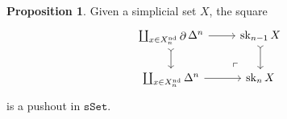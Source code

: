 \documentclass[11pt, reqno]{amsart}
\theoremstyle{definition}
\newtheorem{proposition}[theorem]{Proposition}
\newtheorem{corollary}[theorem]{Corollary}
\newcommand{\N}{\mathbf{N}}
\newcommand{\catfont}{\texttt}
\newcommand{\Set}{{\catfont{Set}}}          %
\newcommand{\sSet}{{\catfont{sSet}}}            %
\DeclareMathOperator{\Nondeg}{nd} %
\DeclareMathOperator{\Sk}{sk} %
\DeclareMathOperator{\Bd}{\partial} %
\begin{document}


\begin{proposition}
\label{prop:filtration-attaching-cells}
Given a simplicial set \(X\), the square
\[
\begin{tikzcd}
\coprod_{x \in X_n^{\Nondeg}} \Bd \Delta^n
\ar[rd, phantom, very near end, "\ulcorner"]
\ar[r] \ar[d, tail]
&\Sk_{n-1} X \ar[d, tail]
\\
\coprod_{x \in X_n^{\Nondeg}} \Delta^n
\ar[r]
&\Sk_n X
\end{tikzcd}
\]
is a pushout in \(\sSet\).
\end{proposition}
\end{document}
